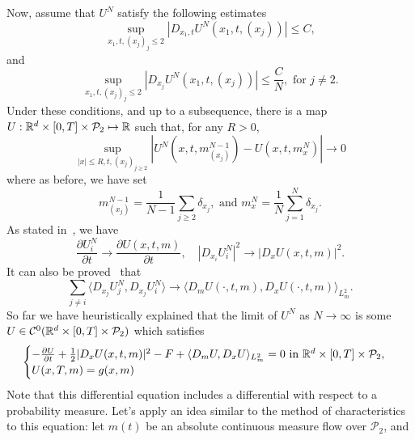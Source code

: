 Now, assume that $U^N$ satisfy the following estimates
\begin{equation}
    \sup_{x_1, t, (x_j)_j \leq 2} \left| D_{x_1, t} U^N (x_1, t, (x_j)) \right| \leq C,
\end{equation}
and
\begin{equation}
    \sup_{x_1, t, (x_j)_j \leq 2} \left| D_{x_j} U^N (x_1, t, (x_j)) \right| \leq  \frac{C}{N}, \text{ for } j\neq 2.
\end{equation}
Under these conditions, and up to a subsequence, there is a map 
$U : \mathbb{R}^d \times [0,T] \times \mathcal{P}_2 \mapsto \mathbb{R}$ such that,
for any $R > 0$,
\begin{equation}
    \sup_{|x| \leq R, t, (x_j)_{j\geq 2}} | U^N(x,t,m^{N-1}_{(x_j)}) - U(x,t,m^N_x) | \to 0
\end{equation}
where as before, we have set
\begin{equation}
    m^{N-1}_{(x_j)} = \frac{1}{N-1} \sum_{j \geq 2} \delta_{x_j}, \text{ and } m^N_x = \frac{1}{N} \sum_{j = 1}^N \delta_{x_j}.
\end{equation}
As stated in~\cite{cardaliaguet2010notes}, we have
\begin{equation}
    \frac{\partial U^N_i}{\partial t} \to \frac{\partial U(x,t,m)}{\partial t}, \quad |D_{x_i} U_i^N|^2 \to |D_x U (x,t,m)|^2.
\end{equation}
It can also be proved~\cite{cardaliaguet2010notes} that
\begin{equation}
    \sum_{j\neq i} \langle D_{x_j} U^N_j , D_{x_j} U^N_i \rangle \to \langle D_m U(\cdot,t,m), D_x U(\cdot, t, m) \rangle_{L^2_m}.
\end{equation}
So far we have heuristically explained that the limit of $U^N$ as $N \to \infty$
is some $U\in \mathcal{C}^0(\mathbb{R}^d \times [0,T] \times \mathcal{P}_2) $
 which satisfies 
 \begin{equation}\label{wass:simple_master_equation}
    \begin{cases}
        - \frac{\partial U}{ \partial t} + \frac{1}{2} |D_x U(x,t,m)|^2 - F + \langle D_m U, D_x U \rangle_{L^2_m} = 0\text{ in }\mathbb{R}^d \times [0,T] \times \mathcal{P}_2,\\
        U(x,T,m) = g(x,m)
    \end{cases}
 \end{equation}
 Note that this differential equation includes a differential with respect to
 a probability measure.
  Let's apply an idea similar to the method of characteristics to this equation:
  let $m(t)$ be an absolute continuous measure flow over $\mathcal{P}_2$, and
